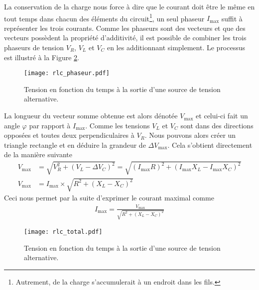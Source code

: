 \documentclass[titlepage,oneside,a4paper,11pt]{book} %
\begin{document}
La conservation de la charge nous force à dire que le courant doit être le même en tout temps dans chacun des éléments du circuit\footnote{Autrement, de la charge s'accumulerait à un endroit dans les fils.}, un seul phaseur $I_{\mathrm{max}}$ suffit à représenter les trois courants. Comme les phaseurs sont des vecteurs et que des vecteurs possèdent la propriété d'additivité, il est possible de combiner les trois phaseurs de tension $V_R$, $V_L$ et $V_C$ en les additionnant simplement. Le processus est illustré à la Figure \ref{fig:rlc_total}.\\

\begin{figure}[H]
  \begin{center}
    \texttt{[image: rlc\_phaseur.pdf]}
    \caption{Tension en fonction du temps à la sortie d'une source de tension alternative.}
    \label{fig:rlc_phaseurs}
  \end{center}
\end{figure}

La longueur du vecteur somme obtenue est alors dénotée $V_{\mathrm{max}}$ et celui-ci fait un angle $\varphi$ par rapport à $I_{\mathrm{max}}$. Comme les tensions $V_L$ et $ V_C$ sont dans des directions opposées et toutes deux perpendiculaires à $V_R$. Nous pouvons alors créer un triangle rectangle et en déduire la grandeur de $\Delta V_{\mathrm{max}}$. Cela s'obtient directement de la manière suivante
\begin{align*}
 V_{\mathrm{max} }&=\sqrt{V_R^2+\left(V_L-\Delta V_C\right)^2}=\sqrt{\left(I_{\mathrm{max} } R\right)^2+\left(I_{\mathrm{max} } X_L-I_{\mathrm{max} } X_C\right)^2} \\
 V_{\mathrm{max} }&=I_{\mathrm{max} } \times \sqrt{R^2+\left(X_L-X_C\right)^2}
\end{align*}
Ceci nous permet par la suite d'exprimer le courant maximal comme
\begin{align*}
    I_{\mathrm{max} }=\frac{V_{\mathrm{max} }}{\sqrt{R^2+\left(X_L-X_C\right)^2}}
\end{align*}

\begin{figure}[H]
  \begin{center}
    \texttt{[image: rlc\_total.pdf]}
    \caption{Tension en fonction du temps à la sortie d'une source de tension alternative.}
    \label{fig:rlc_total}
  \end{center}
\end{figure}
\end{document}

